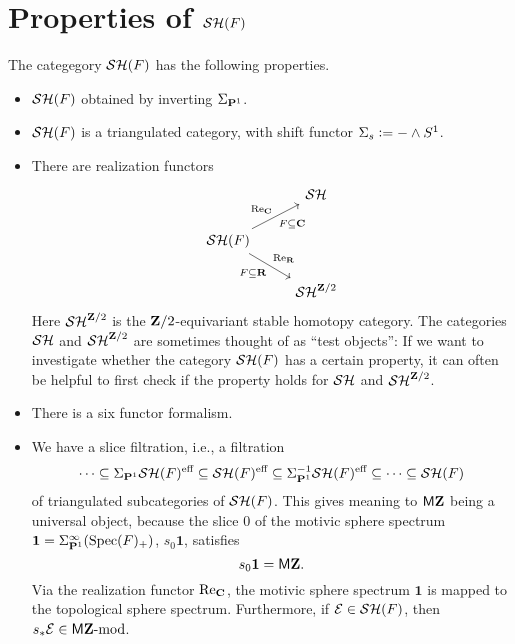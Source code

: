 \section{Properties of $\mathcal{SH}(F)$}
The categegory $\mathcal{SH}(F)$ has the following properties.
\begin{itemize}
\item $\mathcal{SH}(F)$ obtained by inverting $\Sigma_{\mathbf{P}^1}$.
\item $\mathcal{SH}(F)$ is a triangulated category, with shift functor $\Sigma_s\vcentcolon= -\wedge S^1$.
\item There are realization functors 
\[\begin{tikzcd}
& \cal{SH}\\
\calSH(F)\arrow{ru}{\re_\C}[swap]{F\subseteq\C}\arrow{rd}{\re_\R}[swap]{F\subseteq\R} &\\
& \calSH^{\Z/2}\end{tikzcd}\]
Here $\mathcal{SH}^{\mathbf{Z}/2}$ is the $\mathbf{Z}/2$-equivariant stable homotopy category. The categories $\mathcal{SH}$ and $\mathcal{SH}^{\mathbf{Z}/2}$ are sometimes thought of as ``test objects'': If we want to investigate whether the category $\mathcal{SH}(F)$ has a certain property, it can often be helpful to first check if the property holds for $\mathcal{SH}$ and $\mathcal{SH}^{\mathbf{Z}/2}$.
\item There is a six functor formalism.
\item We have a slice filtration, i.e., a filtration
\[
\cdots\subseteq\Sigma_{\mathbf{P}^1}\mathcal{SH}(F)^{\text{eff}}\subseteq\mathcal{SH}(F)^{\text{eff}}\subseteq\Sigma^{-1}_{\mathbf{P}^1}\mathcal{SH}(F)^{\text{eff}}\subseteq\cdots\subseteq\mathcal{SH}(F)
\]of triangulated subcategories of $\mathcal{SH}(F)$. This gives meaning to $\mathsf M\mathbf{Z}$ being a universal object, because the slice $0$ of the motivic sphere spectrum $\mathbf{1}=\Sigma_{\mathbf{P}^1}^\infty(\operatorname{Spec}(F)_+)$, $s_0\mathbf{1}$, satisfies
\[s_0\mathbf{1}=\mathsf M\mathbf{Z}.\]
Via the realization functor $\mathrm{Re}_{\mathbf{C}}$, the motivic sphere spectrum $\mathbf 1$ is mapped to the topological sphere spectrum. Furthermore, if $\mathcal E\in\mathcal{SH}(F)$, then $s_*\mathcal E\in\mathsf M\mathbf{Z}\text{-mod}$.
\end{itemize}

